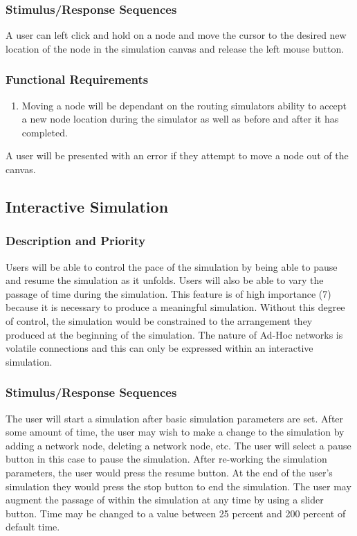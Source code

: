 \documentclass[a4paper,11pt,titlepage]{article}
\begin{document}
\subsubsection{Stimulus/Response Sequences}
A user can left click and hold on a node and move the cursor to the desired new
location of the node in the simulation canvas and release the left mouse button.
\subsubsection{Functional Requirements}
\begin{enumerate}[{\bf {REQ} 1}]
  \item Moving a node will be dependant on the routing simulators ability to accept a
new node location during the simulator as well as before and after it has completed.\\
\end{enumerate}

\begin{description}[\breaklabel]
  \item[Errors] A user will be presented with an error if they attempt to move a node out of the canvas.
\end{description}

\subsection{Interactive Simulation}
\subsubsection{Description and Priority}
Users will be able to control the pace of the simulation by being able to pause and
resume the simulation as it unfolds. Users will also be able to vary the passage of time
during the simulation. This feature is of high importance (7) because it is necessary to
produce a meaningful simulation. Without this degree of control, the simulation would
be constrained to the arrangement they produced at the beginning of the simulation.
The nature of Ad-Hoc networks is volatile connections and this can only be expressed
within an interactive simulation.
\subsubsection{Stimulus/Response Sequences}
The user will start a simulation after basic simulation parameters are set. After some
amount of time, the user may wish to make a change to the simulation by adding a
network node, deleting a network node, etc. The user will select a pause button in this
case to pause the simulation. After re-working the simulation parameters, the user
would press the resume button. At the end of the user’s simulation they would press
the stop button to end the simulation. The user may augment the passage of within
the simulation at any time by using a slider button. Time may be changed to a value
between 25 percent and 200 percent of default time.
\end{document}
